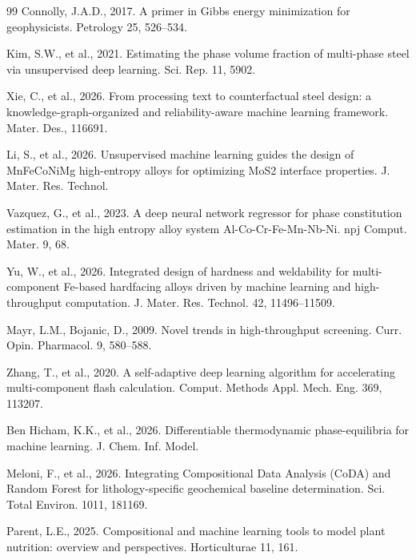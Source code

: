 \documentclass[preprint,12pt,authoryear]{elsarticle}
\begin{document}
\begin{thebibliography}{99}
Connolly, J.A.D., 2017. A primer in Gibbs energy minimization for
geophysicists. Petrology 25, 526--534.

Kim, S.W., et al., 2021. Estimating the phase volume fraction of
multi-phase steel via unsupervised deep learning. Sci. Rep. 11, 5902.

Xie, C., et al., 2026. From processing text to counterfactual steel design:
a knowledge-graph-organized and reliability-aware machine learning
framework. Mater. Des., 116691.

Li, S., et al., 2026. Unsupervised machine learning guides the design of
MnFeCoNiMg high-entropy alloys for optimizing MoS2 interface properties.
J. Mater. Res. Technol.

Vazquez, G., et al., 2023. A deep neural network regressor for phase
constitution estimation in the high entropy alloy system
Al-Co-Cr-Fe-Mn-Nb-Ni. npj Comput. Mater. 9, 68.

Yu, W., et al., 2026. Integrated design of hardness and weldability for
multi-component Fe-based hardfacing alloys driven by machine learning and
high-throughput computation. J. Mater. Res. Technol. 42, 11496--11509.

Mayr, L.M., Bojanic, D., 2009. Novel trends in high-throughput screening.
Curr. Opin. Pharmacol. 9, 580--588.

Zhang, T., et al., 2020. A self-adaptive deep learning algorithm for
accelerating multi-component flash calculation. Comput. Methods Appl. Mech.
Eng. 369, 113207.

Ben Hicham, K.K., et al., 2026. Differentiable thermodynamic
phase-equilibria for machine learning. J. Chem. Inf. Model.

Meloni, F., et al., 2026. Integrating Compositional Data Analysis (CoDA)
and Random Forest for lithology-specific geochemical baseline
determination. Sci. Total Environ. 1011, 181169.

Parent, L.E., 2025. Compositional and machine learning tools to model plant
nutrition: overview and perspectives. Horticulturae 11, 161.


\end{thebibliography}
\end{document}
